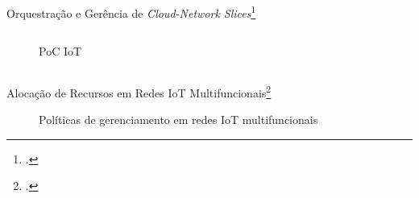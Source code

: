 \begin{frame}{Orquestração e Gerência de \textit{Cloud-Network Slices}\footcite{Rocha2022}}
\begin{columns}
\begin{column}{0.5\linewidth}
\begin{figure}
                \caption{PoC IoT}
            \end{figure}            
        \end{column}
    \end{columns}
\end{frame}

\begin{frame}{Alocação de Recursos em Redes IoT Multifuncionais\footcite{Silva2024}}
    \begin{figure}
        \centering
        \hspace{0.5cm}
        \caption{Políticas de gerenciamento em redes IoT multifuncionais}
    \end{figure}
\end{frame}

